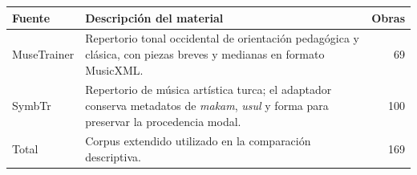 \begin{tabular}{@{}p{2.2cm}p{8.2cm}r@{}}
\hline
Fuente & Descripción del material & Obras \\
\hline
MuseTrainer & Repertorio tonal occidental de orientación pedagógica y clásica, con piezas breves y medianas en formato MusicXML. & 69 \\
SymbTr & Repertorio de música artística turca; el adaptador conserva metadatos de \emph{makam}, \emph{usul} y forma para preservar la procedencia modal. & 100 \\
\hline
Total & Corpus extendido utilizado en la comparación descriptiva. & 169 \\
\hline
\end{tabular}

